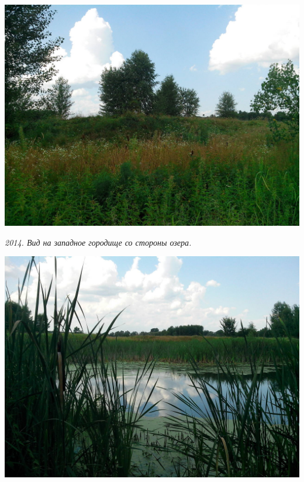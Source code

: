 \begin{center}
\includegraphics[width=\linewidth]{chast-gorodki/gnilusha/s_IMG_20140806_134052.jpg}

\textit{2014. Вид на западное городище со стороны озера.}
\end{center}
\vspace*{\fill}
\newpage
\vspace*{\fill}
\begin{center}
\includegraphics[width=\linewidth]{chast-gorodki/gnilusha/s_IMG_20140806_131518.jpg}
\end{center}


